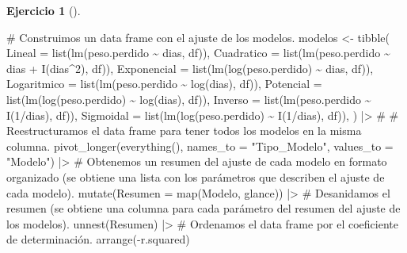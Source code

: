 \documentclass[
  a4paper,
]{scrreport}
\newenvironment{Shaded}{\begin{snugshade}}{\end{snugshade}}
\newcommand{\AttributeTok}[1]{\textcolor[rgb]{0.40,0.45,0.13}{#1}}
\newcommand{\CommentTok}[1]{\textcolor[rgb]{0.37,0.37,0.37}{#1}}
\newcommand{\DecValTok}[1]{\textcolor[rgb]{0.68,0.00,0.00}{#1}}
\newcommand{\FunctionTok}[1]{\textcolor[rgb]{0.28,0.35,0.67}{#1}}
\newcommand{\NormalTok}[1]{\textcolor[rgb]{0.00,0.23,0.31}{#1}}
\newcommand{\OtherTok}[1]{\textcolor[rgb]{0.00,0.23,0.31}{#1}}
\newcommand{\SpecialCharTok}[1]{\textcolor[rgb]{0.37,0.37,0.37}{#1}}
\newcommand{\StringTok}[1]{\textcolor[rgb]{0.13,0.47,0.30}{#1}}
\theoremstyle{definition}
\newtheorem{exercise}{Ejercicio}[chapter]
\theoremstyle{remark}
\begin{document}
\begin{exercise}[]
\begin{enumerate}
\begin{tcolorbox}
\begin{Shaded}
\begin{Highlighting}[]
\CommentTok{\# Construimos un data frame con el ajuste de los modelos.}
\NormalTok{modelos }\OtherTok{\textless{}{-}} \FunctionTok{tibble}\NormalTok{(}
        \AttributeTok{Lineal =} \FunctionTok{list}\NormalTok{(}\FunctionTok{lm}\NormalTok{(peso.perdido }\SpecialCharTok{\textasciitilde{}}\NormalTok{ dias, df)),}
        \AttributeTok{Cuadratico =} \FunctionTok{list}\NormalTok{(}\FunctionTok{lm}\NormalTok{(peso.perdido }\SpecialCharTok{\textasciitilde{}}\NormalTok{ dias }\SpecialCharTok{+} \FunctionTok{I}\NormalTok{(dias}\SpecialCharTok{\^{}}\DecValTok{2}\NormalTok{), df)),}
        \AttributeTok{Exponencial =} \FunctionTok{list}\NormalTok{(}\FunctionTok{lm}\NormalTok{(}\FunctionTok{log}\NormalTok{(peso.perdido) }\SpecialCharTok{\textasciitilde{}}\NormalTok{ dias, df)),}
        \AttributeTok{Logaritmico =} \FunctionTok{list}\NormalTok{(}\FunctionTok{lm}\NormalTok{(peso.perdido }\SpecialCharTok{\textasciitilde{}} \FunctionTok{log}\NormalTok{(dias), df)),}
        \AttributeTok{Potencial =} \FunctionTok{list}\NormalTok{(}\FunctionTok{lm}\NormalTok{(}\FunctionTok{log}\NormalTok{(peso.perdido) }\SpecialCharTok{\textasciitilde{}} \FunctionTok{log}\NormalTok{(dias), df)),}
        \AttributeTok{Inverso =} \FunctionTok{list}\NormalTok{(}\FunctionTok{lm}\NormalTok{(peso.perdido }\SpecialCharTok{\textasciitilde{}} \FunctionTok{I}\NormalTok{(}\DecValTok{1}\SpecialCharTok{/}\NormalTok{dias), df)),}
        \AttributeTok{Sigmoidal =} \FunctionTok{list}\NormalTok{(}\FunctionTok{lm}\NormalTok{(}\FunctionTok{log}\NormalTok{(peso.perdido) }\SpecialCharTok{\textasciitilde{}} \FunctionTok{I}\NormalTok{(}\DecValTok{1}\SpecialCharTok{/}\NormalTok{dias), df)),}
\NormalTok{    )  }\SpecialCharTok{|\textgreater{}} 
    \CommentTok{\# }
    \CommentTok{\# Reestructuramos el data frame para tener todos los modelos en la misma columna.}
    \FunctionTok{pivot\_longer}\NormalTok{(}\FunctionTok{everything}\NormalTok{(), }\AttributeTok{names\_to =} \StringTok{"Tipo\_Modelo"}\NormalTok{, }\AttributeTok{values\_to =} \StringTok{"Modelo"}\NormalTok{)  }\SpecialCharTok{|\textgreater{}} 
    \CommentTok{\# Obtenemos un resumen del ajuste de cada modelo en formato organizado (se obtiene una lista con los parámetros que describen el ajuste de cada modelo).}
    \FunctionTok{mutate}\NormalTok{(}\AttributeTok{Resumen =} \FunctionTok{map}\NormalTok{(Modelo, glance)) }\SpecialCharTok{|\textgreater{}} 
    \CommentTok{\# Desanidamos el resumen (se obtiene una columna para cada parámetro del resumen del ajuste de los modelos).}
    \FunctionTok{unnest}\NormalTok{(Resumen)  }\SpecialCharTok{|\textgreater{}} 
    \CommentTok{\# Ordenamos el data frame por el coeficiente de determinación.}
    \FunctionTok{arrange}\NormalTok{(}\SpecialCharTok{{-}}\NormalTok{r.squared)}


\end{Highlighting}
\end{Shaded}
\end{tcolorbox}
\end{enumerate}
\end{exercise}
\end{document}
